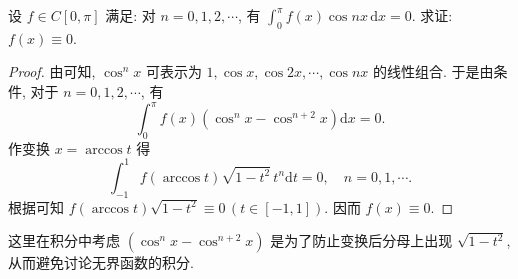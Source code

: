\documentclass[../../main.tex]{subfiles}%
\begin{document}
\begin{example}
设 \( f \in C[0,\pi] \) 满足: 对 \( n = 0,1,2,\cdots \), 有 \( \int_{0}^{\pi} f(x)\cos nx \, \mathrm{d}x = 0 \). 求证: \( f(x) \equiv 0 \).
\end{example}
\begin{proof}
由可知, \( \cos^n x \) 可表示为 \( 1,\cos x,\cos 2x,\cdots,\cos nx \) 的线性组合. 于是由条件, 对于 \( n = 0,1,2,\cdots \), 有
\[
\int_{0}^{\pi} f(x) \left( \cos^n x - \cos^{n + 2} x \right) \mathrm{d}x = 0.
\]
作变换 \( x = \arccos t \) 得
\[
\int_{-1}^{1} f(\arccos t) \sqrt{1 - t^2} \, t^n \mathrm{d}t = 0, \quad n = 0,1,\cdots.
\]
根据可知 \( f(\arccos t) \sqrt{1 - t^2} \equiv 0 \, (t \in [-1,1]) \). 因而 \( f(x) \equiv 0 \).
\end{proof}
\begin{remark}
这里在积分中考虑 \( (\cos^n x - \cos^{n + 2} x) \) 是为了防止变换后分母上出现 \( \sqrt{1 - t^2} \), 从而避免讨论无界函数的积分.
\end{remark}
\end{document}
